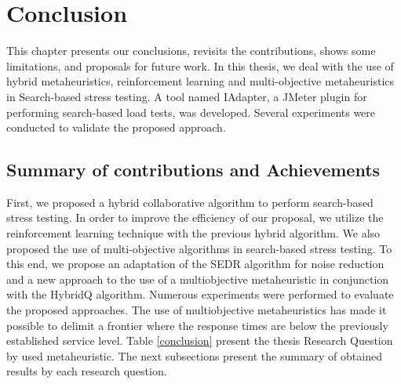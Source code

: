 \documentclass[espaco=umemeio,chapter=TITLE,twoside,openright]{abnt}
\begin{document}









%
%
%
\chapter{Conclusion}

This chapter presents our conclusions, revisits the contributions, shows some limitations, and proposals for future work. In this thesis, we deal with the use of hybrid metaheuristics, reinforcement learning and multi-objective metaheuristics in Search-based stress testing. A tool named IAdapter, a JMeter plugin for performing search-based load tests, was developed. Several experiments were conducted to validate the proposed approach.

\section{Summary of contributions and Achievements}


First, we proposed a hybrid collaborative algorithm to perform search-based stress testing. In order to improve the efficiency of our proposal, we utilize the reinforcement learning technique with the previous hybrid algorithm. We also proposed the use of multi-objective algorithms in search-based stress testing. To this end, we propose an adaptation of the SEDR algorithm for noise reduction and a new approach to the use of a multiobjective metaheuristic in conjunction with the HybridQ algorithm. Numerous experiments were performed to evaluate the proposed approaches. The use of multiobjective metaheuristics has made it possible to delimit a frontier where the response times are below the previously established service level. Table \ref{conclusion} present the thesis Research Question by used metaheuristic. The next subsections present the summary of obtained results by each research question.
\end{document}
